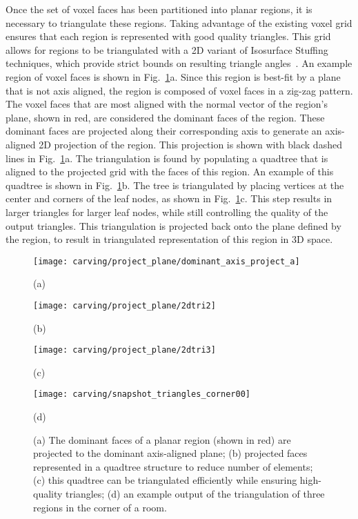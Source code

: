 \documentclass[journal]{IEEEtran}
\begin{document}
Once the set of voxel faces has been partitioned into planar regions, it is necessary to triangulate these regions.  Taking advantage of the existing voxel grid ensures that each region is represented with good quality triangles.  This grid allows for regions to be triangulated with a 2D variant of Isosurface Stuffing techniques, which provide strict bounds on resulting triangle angles~\cite{Isostuffing}.  An example region of voxel faces is shown in Fig.~\ref{fig:triangulation}a.  Since this region is best-fit by a plane that is not axis aligned, the region is composed of voxel faces in a zig-zag pattern.  The voxel faces that are most aligned with the normal vector of the region's plane, shown in red, are considered the dominant faces of the region.  These dominant faces are projected along their corresponding axis to generate an axis-aligned 2D projection of the region.  This projection is shown with black dashed lines in Fig.~\ref{fig:triangulation}a.  The triangulation is found by populating a quadtree that is aligned to the projected grid with the faces of this region.  An example of this quadtree is shown in Fig.~\ref{fig:triangulation}b.  The tree is triangulated by placing vertices at the center and corners of the leaf nodes, as shown in Fig.~\ref{fig:triangulation}c.  This step results in larger triangles for larger leaf nodes, while still controlling the quality of the output triangles.  This triangulation is projected back onto the plane defined by the region, to result in triangulated representation of this region in 3D space.

\begin{figure}[t]

	\begin{minipage}[b]{0.48\linewidth}
		\centerline{\texttt{[image: carving/project\_plane/dominant\_axis\_project\_a]}}
		\centerline{(a)}\medskip
	\end{minipage}
	\hfill
	\begin{minipage}[b]{0.48\linewidth}
		\centerline{\texttt{[image: carving/project\_plane/2dtri2]}}
		\centerline{(b)}\medskip
	\end{minipage}
	
	\begin{minipage}[b]{0.48\linewidth}
		\centerline{\texttt{[image: carving/project\_plane/2dtri3]}}
		\centerline{(c)}\medskip
	\end{minipage}
	\hfill
	\begin{minipage}[b]{0.48\linewidth}
		\centerline{\texttt{[image: carving/snapshot\_triangles\_corner00]}}
		\centerline{(d)}\medskip
	\end{minipage}

	\caption{(a) The dominant faces of a planar region (shown in red) are projected to the dominant axis-aligned plane; (b) projected faces represented in a quadtree structure to reduce number of elements; (c) this quadtree can be triangulated efficiently while ensuring high-quality triangles; (d) an example output of the triangulation of three regions in the corner of a room.}
	\label{fig:triangulation}

\end{figure}
\end{document}
